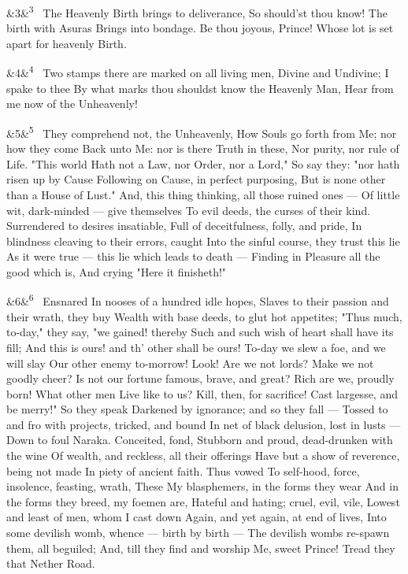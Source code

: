 \documentclass[12pt]{article}
\newcommand{\para}[1][]{\par\noindent\ifx&#1&\else\textsuperscript{\footnotesize #1}~\fi}
\begin{document}
\para[3] The Heavenly Birth brings to deliverance, So should'st thou know! The birth with Asuras Brings into bondage. Be thou joyous, Prince! Whose lot is set apart for heavenly Birth.

\para[4] Two stamps there are marked on all living men, Divine and Undivine; I spake to thee By what marks thou shouldst know the Heavenly Man, Hear from me now of the Unheavenly!

\para[5] They comprehend not, the Unheavenly, How Souls go forth from Me; nor how they come Back unto Me: nor is there Truth in these, Nor purity, nor rule of Life. "This world Hath not a Law, nor Order, nor a Lord," So say they: "nor hath risen up by Cause Following on Cause, in perfect purposing, But is none other than a House of Lust." And, this thing thinking, all those ruined ones --- Of little wit, dark-minded --- give themselves To evil deeds, the curses of their kind. Surrendered to desires insatiable, Full of deceitfulness, folly, and pride, In blindness cleaving to their errors, caught Into the sinful course, they trust this lie As it were true --- this lie which leads to death --- Finding in Pleasure all the good which is, And crying "Here it finisheth!"

\para[6] Ensnared In nooses of a hundred idle hopes, Slaves to their passion and their wrath, they buy Wealth with base deeds, to glut hot appetites; "Thus much, to-day," they say, "we gained! thereby Such and such wish of heart shall have its fill; And this is ours! and th' other shall be ours! To-day we slew a foe, and we will slay Our other enemy to-morrow! Look! Are we not lords? Make we not goodly cheer? Is not our fortune famous, brave, and great? Rich are we, proudly born! What other men Live like to us? Kill, then, for sacrifice! Cast largesse, and be merry!" So they speak Darkened by ignorance; and so they fall --- Tossed to and fro with projects, tricked, and bound In net of black delusion, lost in lusts --- Down to foul Naraka. Conceited, fond, Stubborn and proud, dead-drunken with the wine Of wealth, and reckless, all their offerings Have but a show of reverence, being not made In piety of ancient faith. Thus vowed To self-hood, force, insolence, feasting, wrath, These My blasphemers, in the forms they wear And in the forms they breed, my foemen are, Hateful and hating; cruel, evil, vile, Lowest and least of men, whom I cast down Again, and yet again, at end of lives, Into some devilish womb, whence --- birth by birth --- The devilish wombs re-spawn them, all beguiled; And, till they find and worship Me, sweet Prince! Tread they that Nether Road.
\end{document}

